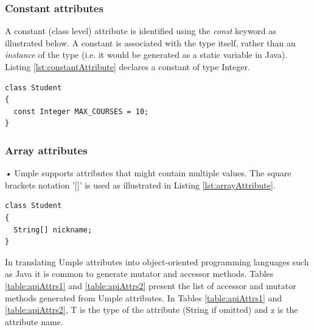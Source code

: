 \subsubsection{Constant attributes}
A constant (class level) attribute is identified using the \textit{const} keyword as illustrated below. A constant is associated with the type itself, rather than an \textit{instance} of the type (i.e. it would be generated as a static variable in Java). Listing \ref{lst:constantAttribute} declares a constant of type Integer. 

\begin{lstlisting}[style=umplePlain,label=lst:constantAttribute, caption=Constants in Umple]
class Student 
{
  const Integer MAX_COURSES = 10;
}
\end{lstlisting}

\subsubsection{Array attributes}\emph{•}
Umple supports attributes that might contain multiple values. The square brackets notation '[]' is used as illustrated in Listing \ref{lst:arrayAttribute}.

\begin{lstlisting}[style=umplePlain,label=lst:arrayAttribute, caption=Array attributes]
class Student 
{
  String[] nickname;
}
\end{lstlisting}

In translating Umple attributes into object-oriented programming languages such as Java it is common to generate mutator and accessor methods. Tables \ref{table:apiAttrs1} and \ref{table:apiAttrs2} present the list of accessor and mutator methods generated from Umple attributes. In Tables \ref{table:apiAttrs1} and \ref{table:apiAttrs2}, T is the type of the attribute (String if omitted) and z is the attribute name.	

